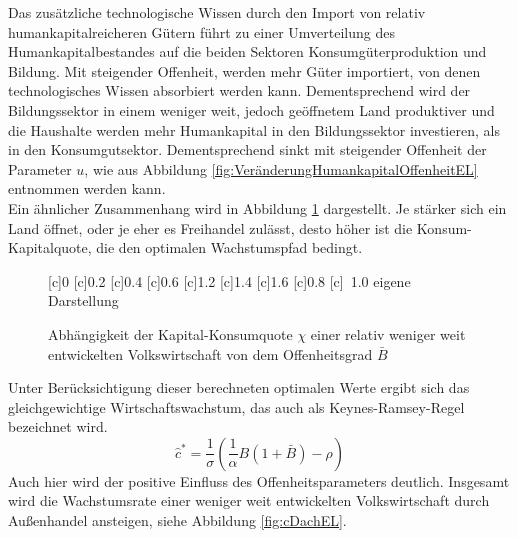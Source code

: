 %
Das zusätzliche technologische Wissen durch den Import von relativ humankapitalreicheren Gütern führt zu einer Umverteilung des Humankapitalbestandes auf die beiden Sektoren Konsumgüterproduktion und Bildung. Mit steigender Offenheit, werden mehr Güter importiert, von denen technologisches Wissen absorbiert werden kann. Dementsprechend wird der Bildungssektor in einem weniger weit, jedoch geöffnetem Land produktiver und die Haushalte werden mehr Humankapital in den Bildungssektor investieren, als in den Konsumgutsektor. Dementsprechend sinkt mit steigender Offenheit der Parameter $u$, wie aus Abbildung \ref{fig:VeränderungHumankapitalOffenheitEL} entnommen werden kann.\\
%
Ein ähnlicher Zusammenhang wird in Abbildung \ref{fig:ChiEL} dargestellt. Je stärker sich ein Land öffnet, oder je eher es Freihandel zulässt, desto höher ist die Konsum-Kapitalquote, die den optimalen Wachstumspfad bedingt.\\
%
\begin{figure}[htb] 
\vspace{0.23cm}
 \centering 
		[c]{\footnotesize{0}}
		[c]{\footnotesize{0.2}}
		[c]{\footnotesize{0.4}}
		[c]{\footnotesize{0.6}}
		[c]{\footnotesize{1.2}}
		[c]{\footnotesize{1.4}}
		[c]{\footnotesize{1.6}}
		[c]{\footnotesize{0.8}}
		[c]{~\footnotesize{1.0}}
\hfill{}  eigene Darstellung
	\caption{Abhängigkeit der Kapital-Konsumquote $\chi$ einer relativ weniger weit entwickelten Volkswirtschaft von dem Offenheitsgrad $\bar{B}$}
	\label{fig:ChiEL}
\end{figure}
%
Unter Berücksichtigung dieser berechneten optimalen Werte ergibt sich das gleichgewichtige Wirtschaftswachstum, das auch als Keynes-Ramsey-Regel bezeichnet wird. 
%
\begin{equation}
	\boxed{\hat{c}^*=\frac{1}{\sigma}\left(\frac{1}{\alpha} B(1+\bar{B})-\rho\right)}
\end{equation}
%
Auch hier wird der positive Einfluss des Offenheitsparameters deutlich. Insgesamt wird die Wachstumsrate einer weniger weit entwickelten Volkswirtschaft durch Außenhandel ansteigen, siehe Abbildung \ref{fig:cDachEL}.  
%
